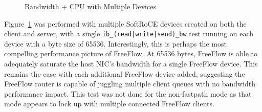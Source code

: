 \documentclass[12pt,titlepage]{article}
\begin{document}
\begin{figure}
	\centering
	\caption{Bandwidth + CPU with Multiple Devices}%
	\label{fig:freeflow_multi_vdev}
\end{figure}

Figure~\ref{fig:freeflow_multi_vdev} was performed with multiple SoftRoCE devices created on both the client and server, with a single \texttt{ib\_(read|write|send)\_bw} test running on each device with a byte size of 65536.
Interestingly, this is perhaps the most compelling performance picture of FreeFlow.
At 65536 bytes, FreeFlow is able to adequately saturate the host NIC's bandwidth for a single FreeFlow device.
This remains the case with each additional FreeFlow device added, suggesting the FreeFlow router is capable of juggling multiple client queues with no bandwidth performance impact.
This test was not done for the non-fastpath mode as that mode appears to lock up with multiple connected FreeFlow clients.
\end{document}
